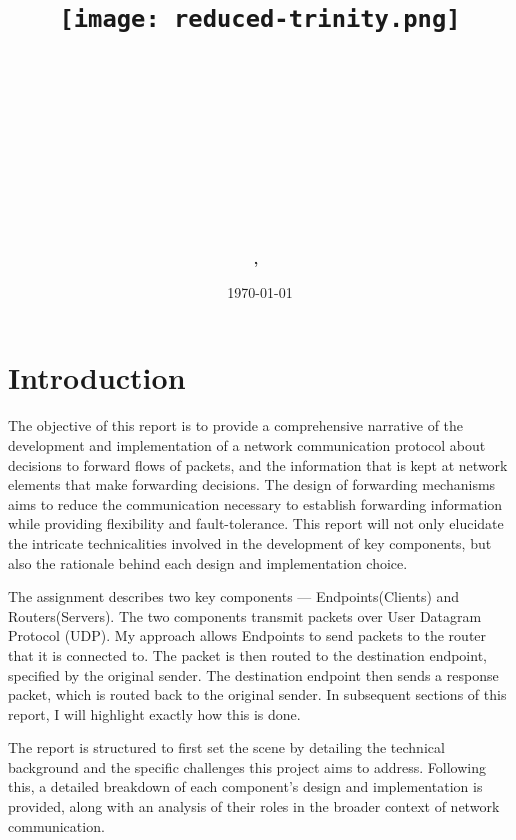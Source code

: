 \documentclass{article}
\title{
\vspace{-1in}
\begin{figure}[!ht]
\flushleft
\texttt{[image: reduced-trinity.png]}
\end{figure}
\vspace{-0.5cm}
\hrulefill \\
\vspace{0.5cm}
\textmd{\textbf{\moduleCode\ \moduleName}}\\
\textmd{\textbf{\assignmentTitle}}\\
\vspace{0.5cm}
\hrulefill \\
}
\author{\textbf{\authorName,\ \authorID}}
\date{\today}
\begin{document}
\lstset{language=Python, captionpos=b, frame=single}
\captionsetup{width=.8\linewidth} 

\maketitle
\tableofcontents
\vspace{0.5in}


\section{Introduction}
\label{sec:Intro}

The objective of this report is to provide a comprehensive narrative of the development and implementation of a network communication protocol about decisions to forward flows of packets, and the information that is kept at network elements that make forwarding decisions. The design of forwarding mechanisms aims to reduce the communication necessary to establish forwarding information while providing flexibility and fault-tolerance. This report will not only elucidate the intricate technicalities involved in the development of key components, but also the rationale behind each design and implementation choice.


The assignment describes two key components — Endpoints(Clients) and Routers(Servers). The two components transmit packets over User Datagram Protocol (UDP). My approach allows Endpoints to send packets to the router that it is connected to. The packet is then routed to the destination endpoint, specified by the original sender. The destination endpoint then sends a response packet, which is routed back to the original sender. In subsequent sections of this report, I will highlight exactly how this is done.


The report is structured to first set the scene by detailing the technical background and the specific challenges this project aims to address. Following this, a detailed breakdown of each component's design and implementation is provided, along with an analysis of their roles in the broader context of network communication. 
\end{document}
